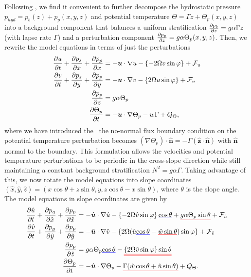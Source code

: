 \documentclass{article}
\def\mathunderline#1#2{\color{#1}\underline{{\color{black}#2}}\color{black}}
\begin{document}
Following \cite{Callies2018RestratificationEddies}, we find it convenient to further decompose the hydrostatic pressure $p_{hyd} = p_{b}(z) + p_{p}(x,y,z)$ and potential temperature $\Theta = \Gamma z + \Theta_{p}(x,y,z)$ into a background component that balances a uniform stratification $\pdv{p_{b}}{z} = g \alpha \Gamma z$ (with lapse rate $\Gamma$) and a perturbation component $\pdv{p_{p}}{z} = g \alpha \Theta_{p}(x,y,z)$. Then, we rewrite the model equations in terms of just the perturbations
\begin{align}
    \pdv{u}{t} + \pdv{p_{s}}{x} + \pdv{p_{p}}{x} &= - \bm{u} \cdot \nabla u -\left\{ -2\Omega v \sin{\varphi} \right\} + \mathcal{F}_{u}
    \\
    \pdv{v}{t} + \pdv{p_{s}}{y} + \pdv{p_{p}}{y} &= - \bm{u} \cdot \nabla v -\left\{2\Omega u \sin{\varphi} \right\} + \mathcal{F}_{v}
    \\
    \pdv{p_{p}}{z} &= g\alpha \Theta_{p}
    \\
    \pdv{\Theta_{p}}{t} &= - \bm{u} \cdot \nabla \Theta_{p} - w\Gamma + Q_{\Theta},
\end{align}
where we have introduced the \ the no-normal flux boundary condition on the potential temperature perturbation becomes $( \nabla \Theta_{p}) \cdot \hat{\bm{n}} = - \Gamma (\hat{\bm{z}} \cdot \hat{\bm{n}})$ with $\hat{\bm{n}}$ normal to the boundary. This formulation allows the velocities and potential temperature perturbations to be periodic in the cross-slope direction while still maintaining a constant background stratification $N^{2} = g \alpha \Gamma$. Taking advantage of this, we now rotate the model equations into slope coordinates $(\hat{x},\hat{y},\hat{z}) = (x\cos{\theta} + z\sin{\theta}, y, z\cos{\theta} - x\sin{\theta})$, where $\theta$ is the slope angle. The model equations in slope coordinates are given by
\begin{align}
    \pdv{\hat{u}}{t} + \pdv{p_{g}}{\hat{x}} + \pdv{p_{p}}{\hat{x}} &= - \hat{\bm{u}} \cdot \nabla \hat{u} - \left\{-2\Omega \hat{v} \sin{\varphi} \right\}\mathunderline{blue}{\cos{\theta}} + \mathunderline{red}{g\alpha \Theta_{p} \sin{\theta}} + \mathcal{F}_{\hat{u}}
    \label{mitgcmrotated1}
    \\
    \pdv{\hat{v}}{t} + \pdv{p_{g}}{\hat{y}} + \pdv{p_{p}}{\hat{y}} &= - \hat{\bm{u}} \cdot \nabla \hat{v} -\left\{2\Omega (\hat{u} \mathunderline{blue}{\cos{\theta}} - \mathunderline{red}{\hat{w}\sin{\theta}}) \sin{\varphi} \right\} + \mathcal{F}_{\hat{v}}
    \\
    \pdv{p_{p}}{\hat{z}} &= g\alpha \Theta_{p}\mathunderline{blue}{\cos{\theta}} - \mathunderline{red}{\mathunderline{red}{\left\{ 2\Omega \hat{v} \sin{\varphi} \right\} \sin{\theta}}}
    \\
    \pdv{\Theta_{p}}{t} &= - \hat{\bm{u}} \cdot \nabla \Theta_{p} - 
    \mathunderline{red}{\Gamma (\hat{w}\cos{\theta} + \hat{u}\sin{\theta})}+ Q_{\Theta}.\label{mitgcmrotated2}
\end{align}
\end{document}

